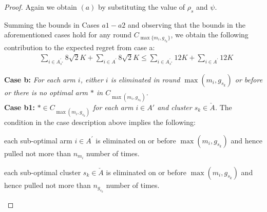 \begin{proof}
Again we obtain $(a)$ by substituting the value of $\rho_s$ and $\psi$.

Summing the bounds in Cases $a1-a2$ and observing that the bounds in the aforementioned cases hold for any round $C_{\max \lbrace m_i,g_{s_k}\rbrace}$, we obtain the following contribution to the expected regret from case a:
\begin{align*}
& \sum_{i\in A_{s^*}^{'}} 8\sqrt{2} K + \sum_{i\in A^{'}} 8\sqrt{2} K \leq \sum_{i\in A_{s^*}^{'}} 12 K + \sum_{i\in A^{'}} 12 K
\end{align*}

\textbf{Case b:} \textit{For each arm $i$, either ${i}$ is eliminated in round $\max (m_{i},g_{s_{k}})$ or before or there is no optimal arm ${*}$ in $C_{\max(m_{i},g_{s_{k}})}$.} \\
\textbf{Case b1:} \textit{${*}\in C_{\max(m_{i},g_{s_{k}})}$ for each arm $i \in A'$ and cluster $s_k \in \check A$.} 
The condition in the case description above implies the following: \\
\begin{inparaenum}[\bfseries (i)]
\item each sub-optimal arm ${i}\in A^{'}$ is  eliminated on or before $\max (m_{i},g_{s_{k}})$ and hence  pulled not more than $ n_{m_{i}}$ number of times.\\
\item each sub-optimal cluster $s_k \in \check A$ is  eliminated on or before $\max (m_{i},g_{s_{k}})$ and hence  pulled not more than $ n_{g_{s_{k}}}$ number of times.
\end{inparaenum}


\end{proof}
